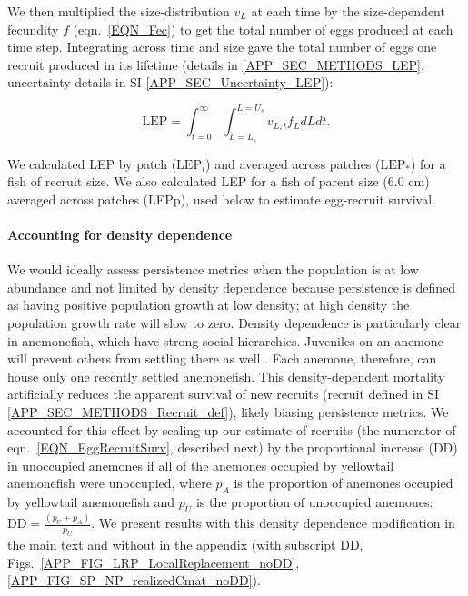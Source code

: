 \documentclass[12pt, oneside]{article}   	%
\begin{document}
We then multiplied the size-distribution $v_L$ at each time by the size-dependent fecundity $f$ (eqn.\ \ref{EQN_Fec}) to get the total number of eggs produced at each time step. Integrating across time and size gave the total number of eggs one recruit produced in its lifetime (details in \ref{APP_SEC_METHODS_LEP}, uncertainty details in SI \ref{APP_SEC_Uncertainty_LEP}): %

\begin{equation}
\text{LEP} = \int_{t=0}^{\infty}\int_{L=L_s}^{L=U_s} v_{L,t} f_L dL dt. \label{EQN_LEP}
\end{equation}

We calculated LEP by patch ($\text{LEP}_i$) and averaged across patches ($\text{LEP}_*$) for a fish of recruit size. We also calculated LEP for a fish of parent size (6.0 cm) averaged across patches (LEPp), used below to estimate egg-recruit survival.

\paragraph*{Accounting for density dependence}  %

We would ideally assess persistence metrics when the population is at low abundance and not limited by density dependence because persistence is defined as having positive population growth at low density; at high density the population growth rate will slow to zero. Density dependence is particularly clear in anemonefish, which have strong social hierarchies. Juveniles on an anemone will prevent others from settling there as well \citep[seen in \textit{A. percula,}][]{buston2003forcible}. Each anemone, therefore, can house only one recently settled anemonefish. This density-dependent mortality artificially reduces the apparent survival of new recruits (recruit defined in SI \ref{APP_SEC_METHODS_Recruit_def}), likely biasing persistence metrics. We accounted for this effect by scaling up our estimate of recruits (the numerator of eqn.\ \ref{EQN_EggRecruitSurv}, described next) by the proportional increase ($\text{DD}$) in unoccupied anemones if all of the anemones occupied by yellowtail anemonefish were unoccupied, where $p_A$ is the proportion of anemones occupied by yellowtail anemonefish and $p_U$ is the proportion of unoccupied anemones: $\text{DD} = \frac{(p_U + p_A)}{p_U}$. We present results with this density dependence modification in the main text and without in the appendix (with subscript DD, Figs.\ \ref{APP_FIG_LRP_LocalReplacement_noDD}, \ref{APP_FIG_SP_NP_realizedCmat_noDD}). %
\end{document}
